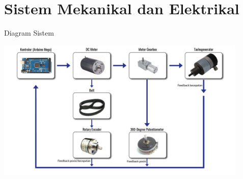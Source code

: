 \documentclass[10pt,xcolor={dvipsnames}]{beamer}
\begin{document}
\section{Sistem Mekanikal dan Elektrikal}


\begin{frame}{Diagram Sistem}
	\begin{center}
		\includegraphics[width=12cm]{Gambar Lain/diagram.png}
	\end{center}
\end{frame}
\end{document}
